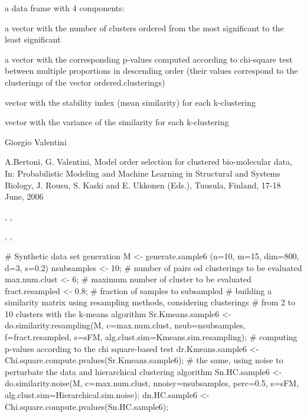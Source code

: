\documentclass{article}
\begin{document}
\begin{Value}
a data frame with 4 components:
\begin{ldescription}
\item[\code{ordered.clusterings }] a vector with the number of clusters ordered from the most significant to the least significant
\item[\code{p.value }] a vector with the corresponding p-values computed according to chi-square test between multiple proportions
in descending order (their values correspond to the clusterings of the vector ordered.clusterings)
\item[\code{means }] vector with the stability index (mean similarity) for each k-clustering
\item[\code{variance }] vector with the variance of the similarity for each k-clustering
\end{ldescription}
\end{Value}
\begin{Author}\relax
Giorgio Valentini 
\end{Author}
\begin{References}\relax
A.Bertoni, G. Valentini, Model order selection for clustered bio-molecular data,  
In: Probabilistic Modeling and Machine Learning in Structural and Systems Biology, J. Rousu, S. Kaski and E. Ukkonen (Eds.), 
Tuusula, Finland, 17-18 June,  2006
\end{References}
\begin{SeeAlso}\relax
{}, ,

, , 
\end{SeeAlso}
\begin{Examples}
\begin{ExampleCode}
# Synthetic data set generation
M <- generate.sample6 (n=10, m=15, dim=800, d=3, s=0.2)
nsubsamples <- 10;  # number of pairs od clusterings to be evaluated
max.num.clust <- 6; # maximum number of cluster to be evaluated
fract.resampled <- 0.8; # fraction of samples to subsampled
# building a similarity matrix using resampling methods, considering clusterings 
# from 2 to 10 clusters with the k-means algorithm
Sr.Kmeans.sample6 <- do.similarity.resampling(M, c=max.num.clust, nsub=nsubsamples, 
                     f=fract.resampled, s=sFM, alg.clust.sim=Kmeans.sim.resampling);
# computing p-values according to the chi square-based test
dr.Kmeans.sample6 <- Chi.square.compute.pvalues(Sr.Kmeans.sample6);
# the same, using noise to perturbate the data and  hierarchical clustering algorithm
Sn.HC.sample6 <- do.similarity.noise(M, c=max.num.clust, nnoisy=nsubsamples, perc=0.5, 
                                 s=sFM, alg.clust.sim=Hierarchical.sim.noise);
dn.HC.sample6 <- Chi.square.compute.pvalues(Sn.HC.sample6);
\end{ExampleCode}
\end{Examples}
\end{document}
